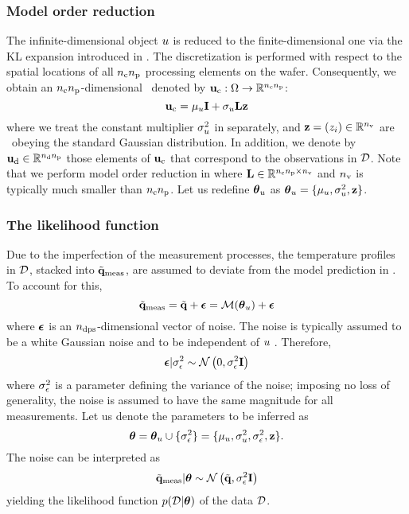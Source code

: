 \subsubsection{Model order reduction} 
The infinite-dimensional object $u$ is reduced to the finite-dimensional one via the KL expansion introduced in . The discretization is performed with respect to the spatial locations of all ${n_{\text{c}}} {n_\text{p}}$ processing elements on the wafer. Consequently, we obtain an ${n_{\text{c}}} {n_\text{p}}$-dimensional \rv\ denoted by $\mathbf{u}_{\text{c}}: \Omega \to \mathbb{R}^{{n_{\text{c}}} {n_\text{p}}}$:
\begin{equation} \elabel{kl-approximation}
  \vu_\dies = \mu_\u \vI + \sigma_\u \mKL \vz
\end{equation}
where we treat the constant multiplier $\sigma^2_u$ in  separately, and $\mathbf{z} = (z_i) \in \mathbb{R}^{n_\text{v}}$ are \rvs\ obeying the standard Gaussian distribution. In addition, we denote by $\mathbf{u}_{\text{d}} \in \mathbb{R}^{{n_{\text{d}}} {n_\text{p}}}$ those elements of $\mathbf{u}_{\text{c}}$ that correspond to the observations in $\mathcal{D}$. Note that we perform model order reduction in  where $\mathbf{L} \in \mathbb{R}^{{n_{\text{c}}} {n_\text{p}} \times {n_\text{v}}}$ and ${n_\text{v}}$ is typically much smaller than ${n_{\text{c}}} {n_\text{p}}$. Let us redefine ${\boldsymbol\theta}_u$ as ${\boldsymbol\theta}_u = \{ \mu_u, \sigma_u^2, \mathbf{z} \}$.

\subsubsection{The likelihood function}
Due to the imperfection of the measurement processes, the temperature profiles in $\mathcal{D}$, stacked into $\tilde{\mathbf{q}}_{\text{meas}}$, are assumed to deviate from the model prediction in . To account for this,
\[
  \mvT_\meas = \mvT + \vnoise = \model{\vparam_\u} + \vnoise
\]
where $\boldsymbol\epsilon$ is an ${n_\text{dps}}$-dimensional vector of noise. The noise is typically assumed to be a white Gaussian noise and to be independent of $u$ \cite{mackay2003, rasmussen2006, marzouk2009}. Therefore,
\[
  \boldsymbol\epsilon | \sigma^2_\epsilon \sim \mathcal{N}\left( 0, \sigma^2_\epsilon \mathbf{I} \right)
\]
where $\sigma^2_\epsilon$ is a parameter defining the variance of the noise; imposing no loss of generality, the noise is assumed to have the same magnitude for all measurements. Let us denote the parameters to be inferred as
\[
  {\boldsymbol\theta} = {\boldsymbol\theta}_u \cup \{ \sigma_\epsilon^2 \} = \{ \mu_u, \sigma_u^2, \sigma_\epsilon^2, \mathbf{z} \}.
\]
The noise can be interpreted as
\begin{equation} \elabel{likelihood}
  \mvT_\meas | \vparam \sim \gaussian{\mvT}{\sigma_\noise^2 \mI}
\end{equation}
yielding the likelihood function $\f{\Data | \vparam}$ of the data $\mathcal{D}$.

